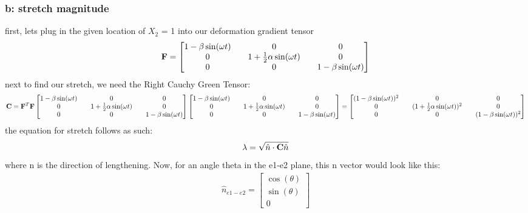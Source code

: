 \subsubsection*{b: stretch magnitude}
first, lets plug in the given location of $X_2$ = 1 into our deformation gradient tensor
\begin{gather}
\mathbf{F} =
    \begin{bmatrix}
        1-\beta\sin(\omega t) && 0 && 0\\
        0 && 1 + \frac{1}{2}\alpha\sin(\omega t) && 0 \\
        0 && 0 && 1-\beta\sin(\omega t)
    \end{bmatrix}
\end{gather}
next to find our stretch, we need the Right Cauchy Green Tensor:
\begin{gather}
\mathbf{C} = \mathbf{F}^T\mathbf{F}
    \begin{bmatrix}
        1-\beta\sin(\omega t) && 0 && 0\\
        0 && 1 + \frac{1}{2}\alpha\sin(\omega t) && 0 \\
        0 && 0 && 1-\beta\sin(\omega t)
    \end{bmatrix}
     \begin{bmatrix}
        1-\beta\sin(\omega t) && 0 && 0\\
        0 && 1 + \frac{1}{2}\alpha\sin(\omega t) && 0 \\
        0 && 0 && 1-\beta\sin(\omega t)
    \end{bmatrix}
    =
    \begin{bmatrix}
        (1-\beta\sin(\omega t))^2 && 0 && 0\\
        0 && (1 + \frac{1}{2}\alpha\sin(\omega t))^2 && 0 \\
        0 && 0 && (1-\beta\sin(\omega t))^2
    \end{bmatrix}
\end{gather}
the equation for stretch follows as such:
\begin{equation}
    \lambda = \sqrt{\hat{n}\cdot\mathbf{C}\hat{n}}
\end{equation}
where n is the direction of lengthening. Now, for an angle theta in the e1-e2 plane, this n vector would look like this:
\begin{gather}
\hat{n}_{e1-e2} = 
    \begin{bmatrix}
        \cos(\theta) \\
        \sin(\theta) \\
        0
    \end{bmatrix}
\end{gather}
